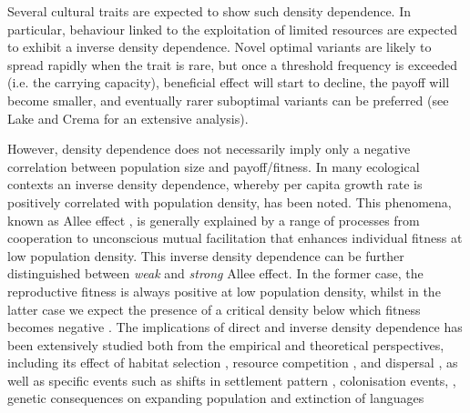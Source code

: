 \documentclass[3p,authoryear,twocolumn]{elsarticle} %
\begin{document}
Several cultural traits are expected to show such density dependence. In particular, behaviour linked to the exploitation of limited resources are expected to exhibit a inverse density dependence. Novel optimal variants are likely to spread rapidly when the trait is rare, but once a threshold frequency is exceeded (i.e. the carrying capacity),  beneficial effect will start to decline, the payoff will become smaller, and eventually rarer suboptimal variants can be preferred (see Lake and Crema \citeyear{lake_and_crema_2012} for an extensive analysis). 

However, density dependence does not necessarily imply only a negative correlation between population size and payoff/fitness. In many ecological contexts an inverse density dependence, whereby per capita growth rate is positively correlated with population density, has been noted. This phenomena, known as Allee effect \citep{allee1958,courchamp_etal_1999}, is generally explained by a range of processes from cooperation to unconscious mutual facilitation that enhances individual fitness at low population density. This inverse density dependence can be further distinguished between \emph{weak} and \emph{strong} Allee effect. In the former case, the reproductive fitness is always positive at low population density, whilst in the latter case we expect the presence of a critical density below which fitness becomes negative \citep{Wang_and_Kot_2001}. The implications of direct and inverse density dependence has been extensively studied both from the empirical and theoretical perspectives, including its effect of habitat selection \citep{greene_and_stamps_2001}, resource competition \citep{jang2013}, and dispersal \citep{steele_2009}, as well as specific events such as shifts in settlement pattern \citep{crema_2014}, colonisation events,  \citep{kennet_etal_2006}, genetic consequences on expanding population \citep{roques_etal_2012} and extinction of languages \citep{sutherland_2003}  
\end{document}
